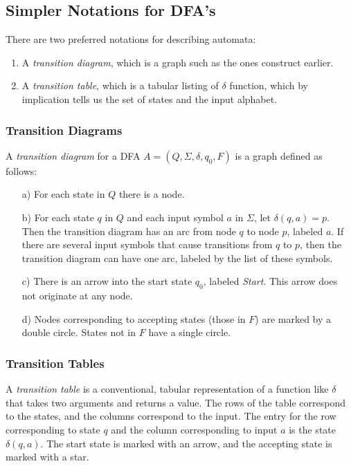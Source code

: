 \documentclass[]{article}
\begin{document}
  \subsection*{Simpler Notations for DFA's}
    There are two preferred notations for describing automata:
    \begin{enumerate}
      \item A \emph{transition diagram}, which is a graph such as the ones
      construct earlier.
      \item A \emph{transition table}, which is a tabular listing of $\delta$
      function, which by implication tells us the set of states and the input
      alphabet.
    \end{enumerate}

    \subsubsection*{Transition Diagrams}
      A \emph{transition diagram} for a DFA $A = (Q, \Sigma, \delta, q_0, F)$
      is a graph defined as follows:
      \begin{enumerate}
        \item[a)] For each state in $Q$ there is a node.
        \item[b)] For each state $q$ in $Q$ and each input symbol $a$ in $
        \Sigma$, let $\delta(q, a) = p.$ Then the transition diagram has an
        arc from node $q$ to node $p$, labeled $a$. If there are several input
        symbols that cause transitions from $q$ to $p$, then the transition
        diagram can have one arc, labeled by the list of these symbols.
        \item[c)] There is an arrow into the start state $q_0$, labeled
        \emph{Start}. This arrow does not originate at any node.
        \item[d)] Nodes corresponding to accepting states (those in $F$) are
        marked by a double circle. States not in $F$ have a single circle.
      \end{enumerate}

    \subsubsection*{Transition Tables}
      A \emph{transition table} is a conventional, tabular representation of a
      function like $\delta$ that takes two arguments and returns a value. The
      rows of the table correspond to the states, and the columns correspond
      to the input. The entry for the row corresponding to state $q$ and the
      column corresponding to input $a$ is the state $\delta(q,a)$. The start
      state is marked with an arrow, and the accepting state is marked with a
      star.
\end{document}
